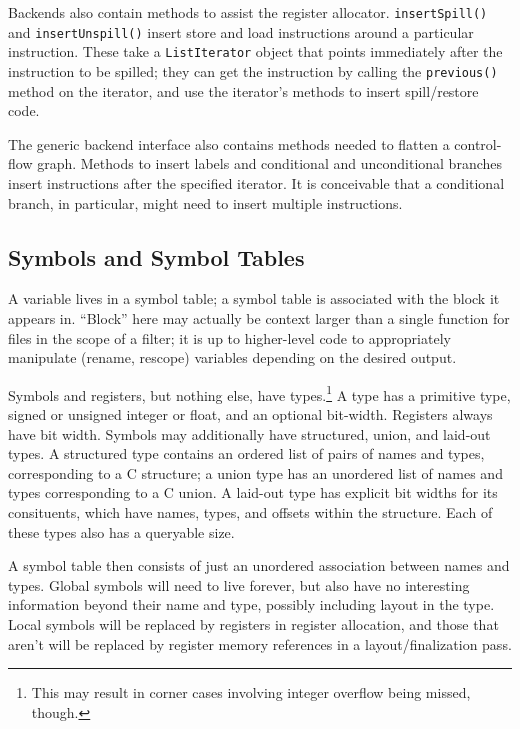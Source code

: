\documentclass[11pt]{article}
\def\class#1{\texttt{#1}}
\begin{document}
Backends also contain methods to assist the register allocator.
\texttt{insert\-Spill()} and \texttt{insert\-Unspill()} insert store and
load instructions around a particular instruction.  These take a
\class{List\-Iterator} object that points immediately after the
instruction to be spilled; they can get the instruction by calling the
\texttt{previous()} method on the iterator, and use the iterator's
methods to insert spill/re\-store code.

The generic backend interface also contains methods needed to flatten
a control-flow graph.  Methods to insert labels and conditional and
unconditional branches insert instructions after the specified
iterator.  It is conceivable that a conditional branch, in particular,
might need to insert multiple instructions.

\subsection{Symbols and Symbol Tables}

A variable lives in a symbol table; a symbol table is associated with
the block it appears in.  ``Block'' here may actually be context
larger than a single function for files in the scope of a filter; it
is up to higher-level code to appropriately manipulate (rename,
rescope) variables depending on the desired output.

Symbols and registers, but nothing else, have types.\footnote{This may
  result in corner cases involving integer overflow being missed,
  though.}  A type has a primitive type, signed or unsigned integer or
float, and an optional bit-width.  Registers always have bit width.
Symbols may additionally have structured, union, and laid-out types.  A
structured type contains an ordered list of pairs of names and types,
corresponding to a C structure; a union type has an unordered list of
names and types corresponding to a C union.  A laid-out type has
explicit bit widths for its consituents, which have names, types, and
offsets within the structure.  Each of these types also has a
queryable size.

A symbol table then consists of just an unordered association between
names and types.  Global symbols will need to live forever, but also
have no interesting information beyond their name and type, possibly
including layout in the type.  Local symbols will be replaced by
registers in register allocation, and those that aren't will be
replaced by register memory references in a layout/finalization pass.
\end{document}
